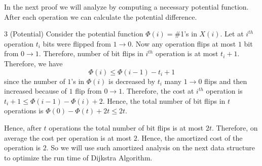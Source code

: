 In the next proof we will analyze by computing a necessary potential function. After each operation we can calculate the potential difference.

\begin{proofmany}{3 (Potential)}
	Consider the potential function $\Phi(i)=\#$1's in $X(i)$. Let at $i^{th}$ operation $t_i$ bits were flipped from $1\to 0$. Now any operation flips at most $1$ bit from $0\to 1$. Therefore, number of bit flips in $i^{th}$ operation is at most $t_i+1$. Therefore, we have $$\Phi(i)\leq \Phi(i-1)-t_i+1$$since the number of $1$'s in $\Phi(i)$ is decreased by $t_i$ many $1\to 0$ flips and then increased because of $1$ flip from $0\to 1$. Therefore, the cost at $i^{th}$ operation is $t_i+1\leq \Phi(i-1)-\Phi(i)+2$. Hence, the total number of bit flips in $t$ operations is $\Phi(0)-\Phi(t)+2t\leq 2t$.
\end{proofmany}

Hence, after $t$ operations the total number of bit flips is at most $2t$. Therefore, on average the cost per operation is at most $2$. Hence, the amortized cost of the operation is $2$. So we will use such amortized analysis on the next data structure to optimize the run time of Dijkstra Algorithm.
